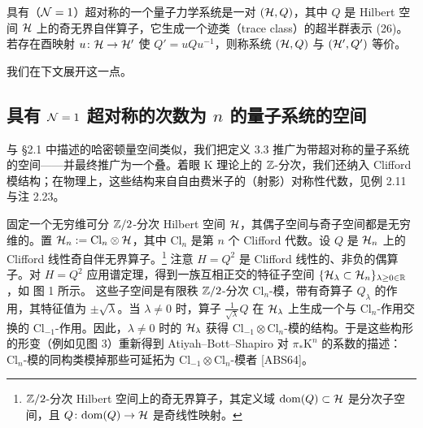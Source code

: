 \begin{definition}[3.3]
具有（$\mathcal{N}=1$）超对称的一个量子力学系统是一对 $(\mathcal{H},Q)$，其中 $Q$ 是 Hilbert 空间 $\mathcal{H}$ 上的奇无界自伴算子，它生成一个迹类（trace class）的超半群表示 (26)。若存在酉映射 $u\colon\mathcal{H}\to\mathcal{H}'$ 使 $Q'=uQu^{-1}$，则称系统 $(\mathcal{H},Q)$ 与 $(\mathcal{H}',Q')$ 等价。
\end{definition}

我们在下文展开这一点。

\subsection{具有 $\mathcal{N}=1$ 超对称的次数为 $n$ 的量子系统的空间}
与 §2.1 中描述的哈密顿量空间类似，我们把定义 3.3 推广为带超对称的量子系统的空间——并最终推广为一个叠。着眼 K 理论上的 $\mathbb{Z}$-分次，我们还纳入 Clifford 模结构；在物理上，这些结构来自自由费米子的（射影）对称性代数，见例 2.11 与注 2.23。

固定一个无穷维可分 $\mathbb{Z}/2$-分次 Hilbert 空间 $\mathcal{H}$，其偶子空间与奇子空间都是无穷维的。置 $\mathcal{H}_n:=\mathrm{Cl}_n\otimes\mathcal{H}$，其中 $\mathrm{Cl}_n$ 是第 $n$ 个 Clifford 代数。设 $Q$ 是 $\mathcal{H}_n$ 上的 Clifford 线性奇自伴无界算子。\footnote{$\mathbb{Z}/2$-分次 Hilbert 空间上的奇无界算子，其定义域 $\mathrm{dom}(Q)\subset\mathcal{H}$ 是分次子空间，且 $Q\colon\mathrm{dom}(Q)\to\mathcal{H}$ 是奇线性映射。} 注意 $H=Q^2$ 是 Clifford 线性的、非负的偶算子。对 $H=Q^2$ 应用谱定理，得到一族互相正交的特征子空间 $\{\mathcal{H}_\lambda\subset\mathcal{H}_n\}_{\lambda\ge0\in\mathbb{R}}$，如
图 1 所示。
这些子空间是有限秩 $\mathbb{Z}/2$-分次 $\mathrm{Cl}_n$-模，带有奇算子 $Q_\lambda$ 的作用，其特征值为 $\pm\sqrt{\lambda}$。当 $\lambda\ne0$ 时，算子 $\frac{1}{\sqrt{\lambda}}Q$ 在 $\mathcal{H}_\lambda$ 上生成一个与 $\mathrm{Cl}_n$-作用交换的 $\mathrm{Cl}_{-1}$-作用。因此，$\lambda\ne0$ 时的 $\mathcal{H}_\lambda$ 获得 $\mathrm{Cl}_{-1}\otimes\mathrm{Cl}_n$-模的结构。于是这些构形的形变（例如见图 3）重新得到 Atiyah–Bott–Shapiro 对 $\pi_*\mathrm{K}^n$ 的系数的描述：$\mathrm{Cl}_n$-模的同构类模掉那些可延拓为 $\mathrm{Cl}_{-1}\otimes\mathrm{Cl}_n$-模者 [ABS64]。

